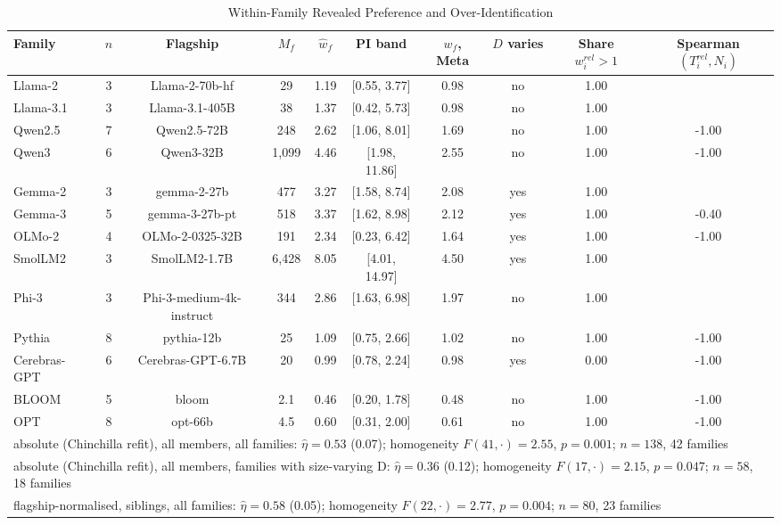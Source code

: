 \begin{table}[htbp]
\centering
\scriptsize
\begin{threeparttable}
\caption{Within-Family Revealed Preference and Over-Identification}
\label{tab:m3_family}
\begin{tabular}{@{}lcccccccc c@{}}
\toprule
Family & $n$ & Flagship & $M_f$ & $\hat w_f$ & PI band & $w_f$, Meta & $D$ varies & Share $w^{rel}_i>1$ & Spearman$(T^{rel}_i,N_i)$ \\
\midrule
Llama-2 & 3 & Llama-2-70b-hf & 29 & 1.19 & [0.55, 3.77] & 0.98 & no & 1.00 &  \\
Llama-3.1 & 3 & Llama-3.1-405B & 38 & 1.37 & [0.42, 5.73] & 0.98 & no & 1.00 &  \\
Qwen2.5 & 7 & Qwen2.5-72B & 248 & 2.62 & [1.06, 8.01] & 1.69 & no & 1.00 & -1.00 \\
Qwen3 & 6 & Qwen3-32B & 1,099 & 4.46 & [1.98, 11.86] & 2.55 & no & 1.00 & -1.00 \\
Gemma-2 & 3 & gemma-2-27b & 477 & 3.27 & [1.58, 8.74] & 2.08 & yes & 1.00 &  \\
Gemma-3 & 5 & gemma-3-27b-pt & 518 & 3.37 & [1.62, 8.98] & 2.12 & yes & 1.00 & -0.40 \\
OLMo-2 & 4 & OLMo-2-0325-32B & 191 & 2.34 & [0.23, 6.42] & 1.64 & yes & 1.00 & -1.00 \\
SmolLM2 & 3 & SmolLM2-1.7B & 6,428 & 8.05 & [4.01, 14.97] & 4.50 & yes & 1.00 &  \\
Phi-3 & 3 & Phi-3-medium-4k-instruct & 344 & 2.86 & [1.63, 6.98] & 1.97 & no & 1.00 &  \\
Pythia & 8 & pythia-12b & 25 & 1.09 & [0.75, 2.66] & 1.02 & no & 1.00 & -1.00 \\
Cerebras-GPT & 6 & Cerebras-GPT-6.7B & 20 & 0.99 & [0.78, 2.24] & 0.98 & yes & 0.00 & -1.00 \\
BLOOM & 5 & bloom & 2.1 & 0.46 & [0.20, 1.78] & 0.48 & no & 1.00 & -1.00 \\
OPT & 8 & opt-66b & 4.5 & 0.60 & [0.31, 2.00] & 0.61 & no & 1.00 & -1.00 \\
\midrule
\multicolumn{10}{l}{absolute (Chinchilla refit), all members, all families: $\hat\eta=0.53$ (0.07); homogeneity $F(41,\cdot)=2.55$, $p=0.001$; $n=138$, 42 families} \\
\multicolumn{10}{l}{absolute (Chinchilla refit), all members, families with size-varying D: $\hat\eta=0.36$ (0.12); homogeneity $F(17,\cdot)=2.15$, $p=0.047$; $n=58$, 18 families} \\
\multicolumn{10}{l}{flagship-normalised, siblings, all families: $\hat\eta=0.58$ (0.05); homogeneity $F(22,\cdot)=2.77$, $p=0.004$; $n=80$, 23 families} \\

\end{tabular}
\end{threeparttable}
\end{table}
